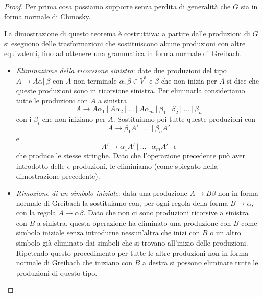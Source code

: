 \documentclass[12pt]{article}
\numberwithin{theorem}{subsection}
\begin{document}
\begin{proof}
	Per prima cosa possiamo supporre senza perdita di generalità che $G$ sia in forma normale di Chmosky.
	
	La dimostrazione di questo teorema è costruttiva: a partire dalle produzioni di $G$ si eseguono delle trasformazioni che sostituiscono alcune produzioni con altre equivalenti, fino ad ottenere una grammatica in forma normale di Greibach.
	
	\begin{itemize}
		\item \textit{Eliminazione della ricorsione sinistra}: date due produzioni del tipo $A \rightarrow A\alpha \vert \ \beta$ con $A$ non terminale $\alpha, \beta \in V^*$ e $\beta$ che non inizia per $A$ si dice che queste produzioni sono in ricorsione sinistra. Per eliminarla consideriamo tutte le produzioni con $A$ a sinistra
		\[
		A \rightarrow A\alpha_1 \ \vert \ A \alpha_2 \ \vert \ ... \ \vert \ A \alpha_m \ \vert \ \beta_1 \ \vert \ \beta_2 \ \vert \ ... \ \vert \ \beta_n
		\]
		con i $\beta_i$ che non iniziano per $A$. Sostituiamo poi tutte queste produzioni con
		\[
		A \rightarrow \beta_1 A' \ \vert \ ... \ \vert \ \beta_n A'
		\]
		e
		\[
		A' \rightarrow \alpha_1 A' \ \vert \ ... \ \vert \ \alpha_m A' \ \vert \ \epsilon
		\]
		che produce le stesse stringhe. Dato che l'operazione precedente può aver introdotto delle $\epsilon$-produzioni, le eliminiamo (come spiegato nella dimostrazione precedente).
		
		\item \textit{Rimozione di un simbolo iniziale}: data una produzione $A \rightarrow B\beta$ non in forma normale di Greibach la sostituiamo con, per ogni regola della forma $B \rightarrow \alpha$, con la regola $A \rightarrow \alpha\beta$. Dato che non ci sono produzioni ricorsive a sinistra con $B$ a sinistra, questa operazione ha eliminato una produzione con $B$ come simbolo iniziale senza introdurne nessun'altra che inizi con $B$ o un altro simbolo già eliminato dai simboli che si trovano all'inizio delle produzioni. Ripetendo questo procedimento per tutte le altre produzioni non in forma normale di Greibach che iniziano con $B$ a destra si possono eliminare tutte le produzioni di questo tipo.
		

\end{itemize}
\end{proof}
\end{document}
